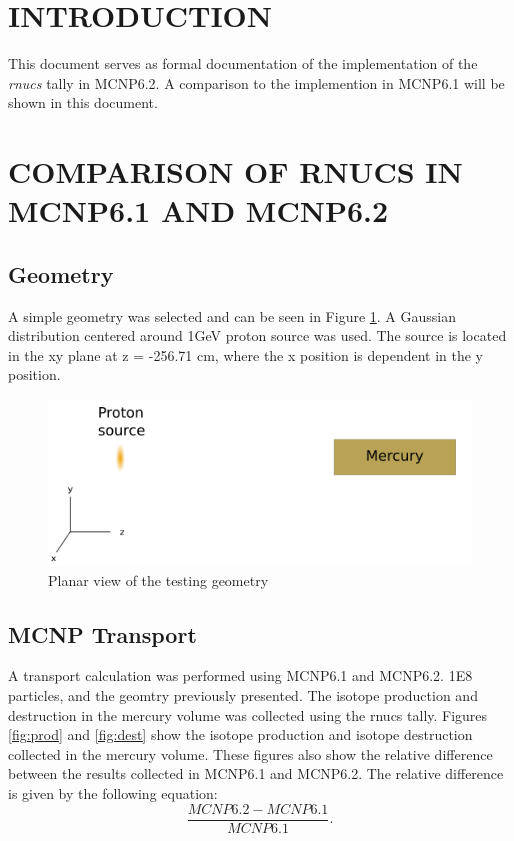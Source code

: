 \section{INTRODUCTION}

This document serves as formal documentation of the implementation of
the \textit{rnucs} tally in MCNP6.2. A comparison to the implemention
in MCNP6.1 will be shown in this document. 

\section{COMPARISON OF RNUCS IN MCNP6.1 AND MCNP6.2}

\subsection{Geometry}
A simple geometry was selected and can be seen in Figure \ref{fig:merbox.png}.
A Gaussian distribution centered around 1GeV proton source was used. 
The source is located in the xy plane at z = -256.71 cm, where the x position is
dependent in the y position. 


\begin{figure}[h!]
        \centering
        \includegraphics[scale=0.7]{figs/mercury.png}
        \caption[VPI]{Planar view of the testing geometry}
        \label{fig:merbox.png}
\end{figure}


\subsection{MCNP Transport}
A transport calculation was performed using MCNP6.1 and MCNP6.2.
1E8 particles, and the geomtry previously presented. 
The isotope production and destruction in the mercury volume was collected
using the rnucs tally. 
Figures \ref{fig:prod} and \ref{fig:dest}  show the isotope production
and isotope destruction collected in the mercury volume. These figures also
show the relative difference between the results collected in MCNP6.1
and MCNP6.2. 
The relative difference is given by the following equation:
\begin{equation}
	\frac{MCNP6.2 - MCNP6.1}{MCNP6.1}.
\end{equation}
